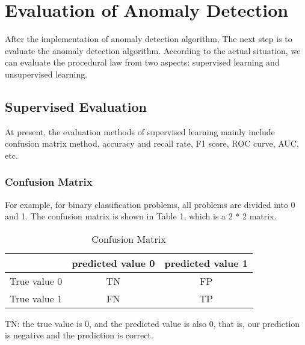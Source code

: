 
\section{Evaluation of Anomaly Detection}

After the implementation of anomaly 
detection algorithm,
The next step is to evaluate the 
anomaly detection algorithm.
According to the actual situation, 
we can evaluate the procedural law 
from two aspects: supervised learning 
and unsupervised learning.

\subsection{Supervised Evaluation}
At present, 
the evaluation methods of supervised learning mainly
include confusion matrix method, accuracy and recall rate,
F1 score,
ROC curve,
AUC,
etc.

\subsubsection{Confusion Matrix}
For example,
for binary classification problems,
all problems are divided into 0 and 1.
The confusion matrix is shown in Table 1,
which is a 2 * 2 matrix.

\begin{table}  \centering
  \caption{Confusion Matrix}
  \label{tbl:overall-experiments}
  \begin{tabular}{ccc}
\toprule
    & predicted value 0 & predicted value 1  \\
\midrule
    True value 0& TN & FP  \\
    True value 1& FN & TP  \\

\bottomrule
\end{tabular}
\end{table}


TN:
the true value is 0,
and the predicted value is also 0,
that is,
our prediction is negative and the prediction is correct.

